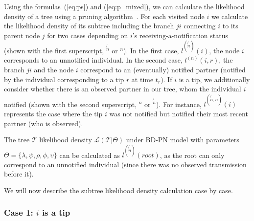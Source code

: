 \documentclass[a4paper,10pt]{article}
\begin{document}
Using the formulas~(\ref{eq:ps}) and (\ref{eq:p_mixed}), we can calculate the likelihood density of a tree using a pruning algorithm~\citep{10.1093/sysbio/22.3.240}. For each visited node $i$ we calculate the likelihood density of its subtree including the branch $ji$ connecting $i$ to its parent node $j$ for two cases depending on $i$'s receiving-a-notification status (shown with the first superscript, $^{\not{n}}$ or $^n$). In the first case,  $l^{(\not{n})}(i)$, the node $i$ corresponds to an unnotified individual. In the second case, $l^{(n)}(i, r)$, the branch $ji$ and the node $i$ correspond to an (eventually) notified partner (notified by the individual corresponding to a tip $r$ at time $t_r$). If $i$ is a tip, we additionally consider whether there is an observed partner in our tree, whom the individual $i$ notified  (shown with the second superscript, $^n$ or $^{\not{n}}$). For instance, $l^{(\not{n},n)}(i)$ represents the case where the tip $i$ was not notified but notified their most recent partner (who is observed). %

The tree $\mathscr{T}$ likelihood density $\mathscr{L}(\mathscr{T}|\Theta)$ under BD-PN model with parameters $\Theta=\{\lambda, \psi, \rho, \phi, \upsilon\}$ can be calculated as $l^{(\not{n})}(root)$, as the root can only correspond to an unnotified individual (since there was no observed transmission before it).

We will now describe the subtree likelihood density calculation case by case.

\subsubsection*{Case 1: $i$ is a tip} 
\end{document}
